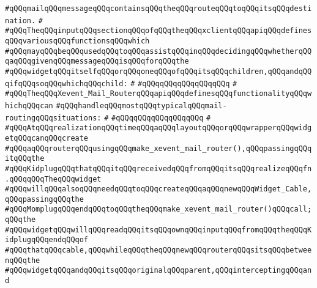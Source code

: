 \verb|#qQQqmailqQQqmessageqQQqcontainsqQQqtheqQQqrouteqQQqtoqQQqitsqQQqdestination.|\newline
\verb|#|\newline
\verb|#qQQqTheqQQqinputqQQqsectionqQQqofqQQqtheqQQqxclientqQQqapiqQQqdefinesqQQqvariousqQQqfunctionsqQQqwhich|\newline
\verb|#qQQqmayqQQqbeqQQqusedqQQqtoqQQqassistqQQqinqQQqdecidingqQQqwhetherqQQqaqQQqgivenqQQqmessageqQQqisqQQqforqQQqthe|\newline
\verb|#qQQqwidgetqQQqitselfqQQqorqQQqoneqQQqofqQQqitsqQQqchildren,qQQqandqQQqifqQQqsoqQQqwhichqQQqchild:|\newline
\verb|#|\newline
\verb|#qQQqqQQqqQQqqQQqqQQq|\newline
\verb|#|\newline
\verb|#qQQqTheqQQqXevent_Mail_RouterqQQqapiqQQqdefinesqQQqfunctionalityqQQqwhichqQQqcan|\newline
\verb|#qQQqhandleqQQqmostqQQqtypicalqQQqmail-routingqQQqsituations:|\newline
\verb|#|\newline
\verb|#qQQqqQQqqQQqqQQqqQQq|\newline
\verb|#|\newline
\verb|#qQQqAtqQQqrealizationqQQqtimeqQQqaqQQqlayoutqQQqorqQQqwrapperqQQqwidgetqQQqcanqQQqcreate|\newline
\verb|#qQQqaqQQqrouterqQQqusingqQQqmake_xevent_mail_router(),qQQqpassingqQQqitqQQqthe|\newline
\verb|#qQQqKidplugqQQqthatqQQqitqQQqreceivedqQQqfromqQQqitsqQQqrealizeqQQqfn.qQQqqQQqTheqQQqwidget|\newline
\verb|#qQQqwillqQQqalsoqQQqneedqQQqtoqQQqcreateqQQqaqQQqnewqQQqWidget_Cable,qQQqpassingqQQqthe|\newline
\verb|#qQQqMomplugqQQqendqQQqtoqQQqtheqQQqmake_xevent_mail_router()qQQqcall;qQQqthe|\newline
\verb|#qQQqwidgetqQQqwillqQQqreadqQQqitsqQQqownqQQqinputqQQqfromqQQqtheqQQqKidplugqQQqendqQQqof|\newline
\verb|#qQQqthatqQQqcable,qQQqwhileqQQqtheqQQqnewqQQqrouterqQQqsitsqQQqbetweenqQQqthe|\newline
\verb|#qQQqwidgetqQQqandqQQqitsqQQqoriginalqQQqparent,qQQqinterceptingqQQqand|\newline
